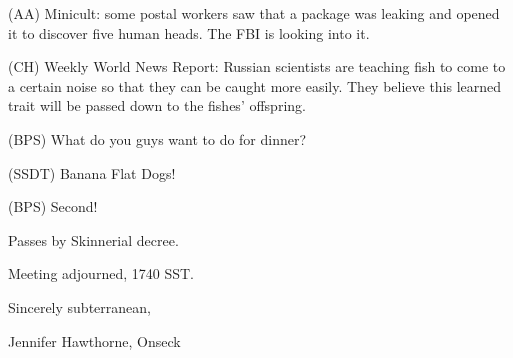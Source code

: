 \documentclass[12pt]{article}
\begin{document}
(AA) Minicult: some postal workers saw that a package was leaking and opened it to discover five human heads. The FBI is looking into it.

(CH) Weekly World News Report: Russian scientists are teaching fish to come to a certain noise so that they can be caught more easily. They believe this learned trait will be passed down to the fishes' offspring.

(BPS) What do you guys want to do for dinner?

(SSDT) Banana Flat Dogs!

(BPS) Second!

Passes by Skinnerial decree.

\vspace{12pt}

\noindent
Meeting adjourned, 1740 SST.

\vspace{18pt}

\centerline{Sincerely subterranean,}
\centerline{Jennifer Hawthorne, Onseck}
\end{document}
